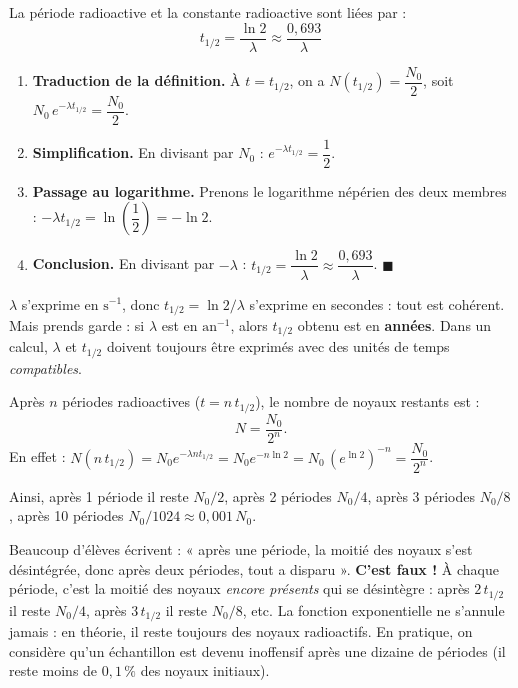 \documentclass[11pt]{article}
\begin{document}
\begin{propriete}
La période radioactive et la constante radioactive sont liées par :
\[ \boxed{t_{1/2} = \dfrac{\ln 2}{\lambda} \approx \dfrac{0{,}693}{\lambda}} \]
\end{propriete}

\begin{experience}
\begin{enumerate}
\item \textbf{Traduction de la définition.} À $t = t_{1/2}$, on a $N(t_{1/2}) = \dfrac{N_0}{2}$, soit $N_0\,e^{-\lambda t_{1/2}} = \dfrac{N_0}{2}$.
\item \textbf{Simplification.} En divisant par $N_0$ : $e^{-\lambda t_{1/2}} = \dfrac{1}{2}$.
\item \textbf{Passage au logarithme.} Prenons le logarithme népérien des deux membres : $-\lambda t_{1/2} = \ln\!\left(\dfrac{1}{2}\right) = -\ln 2$.
\item \textbf{Conclusion.} En divisant par $-\lambda$ : $t_{1/2} = \dfrac{\ln 2}{\lambda} \approx \dfrac{0{,}693}{\lambda}$. \hfill$\blacksquare$
\end{enumerate}
\end{experience}

\begin{attention}
$\lambda$ s'exprime en $\mathrm{s^{-1}}$, donc $t_{1/2} = \ln 2 / \lambda$ s'exprime en secondes : tout est cohérent. Mais prends garde : si $\lambda$ est en $\mathrm{an^{-1}}$, alors $t_{1/2}$ obtenu est en \textbf{années}. Dans un calcul, $\lambda$ et $t_{1/2}$ doivent toujours être exprimés avec des unités de temps \emph{compatibles}.
\end{attention}

\begin{propriete}
Après $n$ périodes radioactives ($t = n\,t_{1/2}$), le nombre de noyaux restants est :
\[ N = \dfrac{N_0}{2^n}. \]
En effet : $N(n\,t_{1/2}) = N_0 e^{-\lambda n t_{1/2}} = N_0 e^{-n\ln 2} = N_0\,(e^{\ln 2})^{-n} = \dfrac{N_0}{2^n}$.
\end{propriete}

Ainsi, après 1 période il reste $N_0/2$, après 2 périodes $N_0/4$, après 3 périodes $N_0/8$, après 10 périodes $N_0/1024 \approx 0{,}001\,N_0$.

\begin{attention}
Beaucoup d'élèves écrivent : « après une période, la moitié des noyaux s'est désintégrée, donc après deux périodes, tout a disparu ». \textbf{C'est faux !} À chaque période, c'est la moitié des noyaux \emph{encore présents} qui se désintègre : après $2\,t_{1/2}$ il reste $N_0/4$, après $3\,t_{1/2}$ il reste $N_0/8$, etc. La fonction exponentielle ne s'annule jamais : en théorie, il reste toujours des noyaux radioactifs. En pratique, on considère qu'un échantillon est devenu inoffensif après une dizaine de périodes (il reste moins de $0{,}1\,\%$ des noyaux initiaux).
\end{attention}
\end{document}
